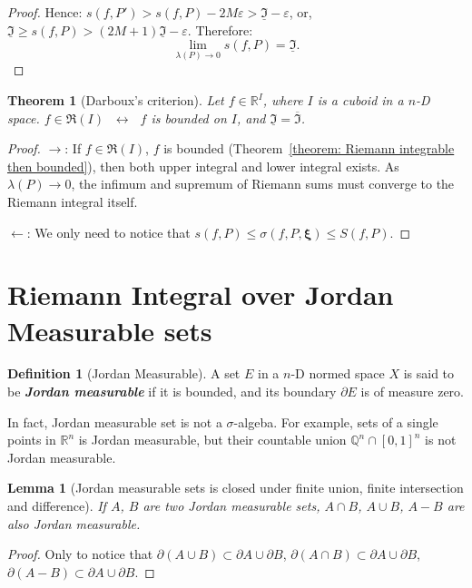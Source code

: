 \documentclass[openany]{book}
\newcommand*{\indexbf}[1]{\emph{\textbf{#1}}\index{#1}} %
\theoremstyle{plain}
\newtheorem{theorem}{Theorem}[section] %
\newtheorem{lemma}{Lemma} %
\theoremstyle{definition}
\newtheorem{definition}{Definition}[section] %
\newcommand*{\bv}{\boldsymbol} %
\newcommand*{\IFF}{\;\leftrightarrow\;} %
\begin{document}
\begin{proof}
	Hence: $s(f, P') > s(f, P) - 2M \varepsilon > \underline{\mathfrak I} - \varepsilon$, or, $\underline{\mathfrak I} \geq s(f, P) > (2M + 1)\underline{\mathfrak I} - \varepsilon$. 
	Therefore:
	\begin{equation*}
		\lim_{\lambda(P) \to 0} s(f, P) = \underline{\mathfrak I}.
	\end{equation*}
\end{proof}

\begin{theorem}[Darboux's criterion]
	\label{theorem: Darboux's criterion}
	Let $f \in \mathbb R^I$, where $I$ is a cuboid in a $n$-D space.
	$f \in \mathfrak R(I)$ $\IFF$ $f$ is bounded on $I$, and $\underline{\mathfrak I} = \overline{\mathfrak I}$.
\end{theorem}
\begin{proof}
	$\to$: If $f \in \mathfrak R(I)$, $f$ is bounded (Theorem~\ref{theorem: Riemann integrable then bounded}), then both upper integral and lower integral exists. 
	As $\lambda(P) \to 0$, the infimum and supremum of Riemann sums must converge to the Riemann integral itself.

	$\gets$: We only need to notice that $s(f, P) \leq \sigma(f, P, \bv \xi) \leq S(f, P)$.
\end{proof}

\section{Riemann Integral over Jordan Measurable sets}

\begin{definition}[Jordan Measurable]
	A set $E$ in a $n$-D normed space $X$ is said to be \indexbf{Jordan measurable} if it is bounded, and its boundary $\partial E$ is of measure zero.
\end{definition}

In fact, Jordan measurable set is not a $\sigma$-algeba. 
For example, sets of a single points in $\mathbb R^n$ is Jordan measurable, but their countable union $\mathbb Q^n \cap [0, 1]^n$ is not Jordan measurable.

\begin{lemma}[Jordan measurable sets is closed under finite union, finite intersection and difference]
	\label{lemma: Jordan measurable sets is closed under finite union, finite intersection and difference}
	If $A$, $B$ are two Jordan measurable sets, $A \cap B$, $A \cup B$, $A - B$ are also Jordan measurable.
\end{lemma}
\begin{proof}
	Only to notice that $\partial(A \cup B) \subset \partial A \cup \partial B$, $\partial(A \cap B) \subset \partial A \cup \partial B$, $\partial(A - B) \subset \partial A \cup \partial B$.
\end{proof}
\end{document}
